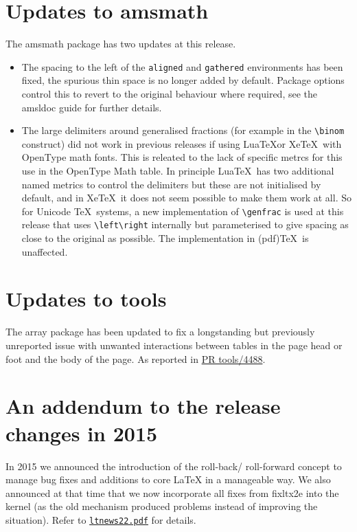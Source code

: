 \documentclass{ltnews}
\begin{document}
\section{Updates to \textsf{amsmath}}
The \textsf{amsmath} package has two updates at this release.
\begin{itemize}
\item The spacing to the left of the \texttt{aligned} and
  \texttt{gathered} environments has been fixed, the spurious thin
  space is no longer added by default. Package options control this
  to revert to the original behaviour where required, see the
  \textsf{amsldoc} guide for further details. 
\item The large delimiters around generalised fractions (for example
  in the \verb|\binom| construct) did not work in previous releases if
  using Lua\TeX or Xe\TeX\ with OpenType math fonts. This is releated
  to the lack of specific metrcs for this use in the OpenType Math
  table. In principle Lua\TeX\ has two additional named metrics
  to control the delimiters but these are not initialised by default,
  and in Xe\TeX\ it does not seem possible to make them work at all.
  So for Unicode \TeX\ systems, a new implementation of
  \verb|\genfrac| is used at this release that uses \verb|\left\right|
  internally but parameterised to give spacing as close to the
  original as possible. The implementation in (pdf)\TeX\ is
  unaffected.
\end{itemize}

\section{Updates to \textsf{tools}}
The \textsf{array} package has been updated to fix a longstanding but
previously unreported issue with unwanted interactions between tables
in the page head or foot and the body of the page. As reported in
\href{http://www.latex-project.org/cgi-bin/ltxbugs2html?pr=tools/4488}{PR
  tools/4488}.

\section{An addendum to the release changes in 2015}

In 2015 we announced the introduction of the roll-back\slash
roll-forward concept to manage bug fixes and additions to core
\LaTeX{} in a manageable way. We also announced at that time
that we now incorporate all fixes from \textsf{fixltx2e} into the
kernel (as the old mechanism produced problems instead of improving
the situation). Refer to
\href{https://www.latex-project.org/news/latex2e-news/ltnews22.pdf}{\texttt{ltnews22.pdf}}
for details.
\end{document}
